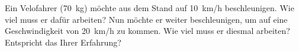
\begin{aufgabe}
	Ein Velofahrer (\SI{70}{kg}) möchte aus dem Stand auf \SI{10}{km/h} beschleunigen.
	Wie viel muss er dafür arbeiten?
	Nun möchte er weiter beschleunigen, um auf eine Geschwindigkeit von \SI{20}{km/h} zu kommen.
	Wie viel muss er diesmal arbeiten?
	Entspricht das Ihrer Erfahrung?
\end{aufgabe}


